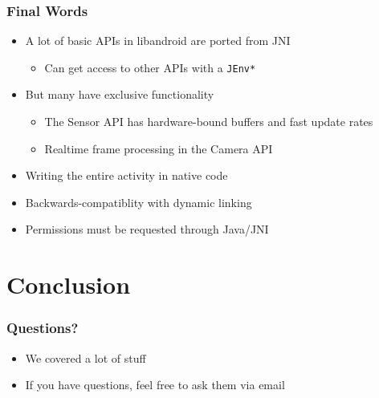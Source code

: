 \documentclass[10pt,mathserif]{beamer}
\begin{document}
	\begin{frame}
		\frametitle{Final Words}

		\begin{itemize}
			\item A lot of basic APIs in libandroid are ported from JNI
			\begin{itemize}
				\item Can get access to other APIs with a \lstinline{JEnv*}
			\end{itemize}
			\item But many have exclusive functionality
			\begin{itemize}
				\item The Sensor API has hardware-bound buffers and fast update rates
				\item Realtime frame processing in the Camera API
			\end{itemize}
			\item Writing the entire activity in native code
			\item Backwards-compatiblity with dynamic linking
			\item Permissions must be requested through Java/JNI
		\end{itemize}
	\end{frame}

	\section{Conclusion}

	\begin{frame}
		\frametitle{Questions?}

		\begin{itemize}
			\item We covered a lot of stuff
			\item If you have questions, feel free to ask them via email
		\end{itemize}

	\end{frame}
\end{document}
